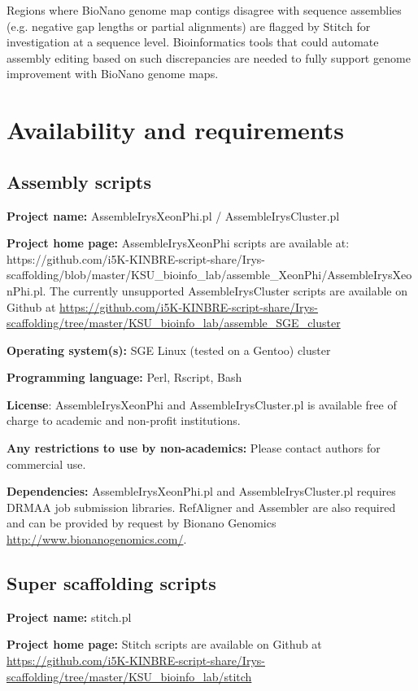 \documentclass{bmcart}
\begin{document}
Regions where BioNano genome map contigs disagree with sequence assemblies (e.g. negative gap lengths or partial alignments) are flagged by Stitch for investigation at a sequence level. Bioinformatics tools that could automate assembly editing based on such discrepancies are needed to fully support genome improvement with BioNano genome maps. 

\section*{Availability and requirements}

\subsection*{\textbf{Assembly scripts}}

\textbf{Project name:} AssembleIrysXeonPhi.pl / AssembleIrysCluster.pl

\textbf{Project home page:} AssembleIrysXeonPhi scripts are available at: https://github.com/i5K-KINBRE-script-share/Irys-scaffolding/blob/master/KSU\_bioinfo\_lab/assemble\_XeonPhi/AssembleIrysXeonPhi.pl. The currently unsupported AssembleIrysCluster scripts are available on Github at \url{https://github.com/i5K-KINBRE-script-share/Irys-scaffolding/tree/master/KSU\_bioinfo\_lab/assemble\_SGE\_cluster}

\textbf{Operating system(s):} SGE Linux (tested on a Gentoo) cluster

\textbf{Programming language:} Perl, Rscript, Bash

\textbf{License}: AssembleIrysXeonPhi and AssembleIrysCluster.pl is available free of charge to academic and non-profit institutions.

\textbf{Any restrictions to use by non-academics:} Please contact authors for commercial use.

\textbf{Dependencies:} AssembleIrysXeonPhi.pl and AssembleIrysCluster.pl requires DRMAA job submission libraries. RefAligner and Assembler are also required and can be provided by request by Bionano Genomics \url{http://www.bionanogenomics.com/}.

\subsection*{\textbf{Super scaffolding scripts}}

\textbf{Project name:} stitch.pl

\textbf{Project home page:} Stitch scripts are available on Github at \url{https://github.com/i5K-KINBRE-script-share/Irys-scaffolding/tree/master/KSU\_bioinfo\_lab/stitch}
\end{document}
